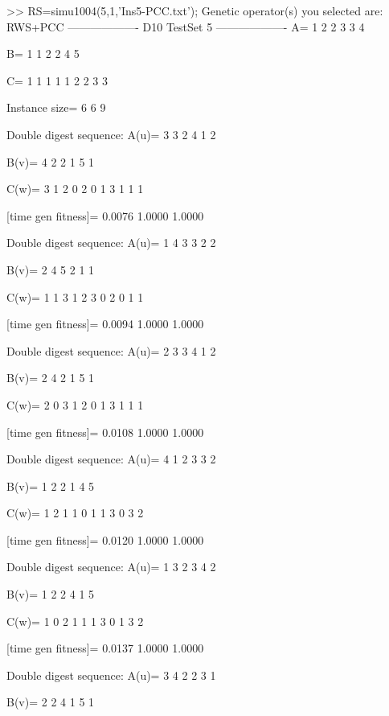 >> RS=simu1004(5,1,'Ins5-PCC.txt');
Genetic operator(s) you selected are:
RWS+PCC
------------------- D10 TestSet 5 -------------------
A=
     1     2     2     3     3     4

B=
     1     1     2     2     4     5

C=
     1     1     1     1     1     2     2     3     3

Instance size=
     6     6     9

Double digest sequence:
A(u)=
     3     3     2     4     1     2

B(v)=
     4     2     2     1     5     1

C(w)=
     3     1     2     0     2     0     1     3     1     1     1

[time gen fitness]=
    0.0076    1.0000    1.0000

Double digest sequence:
A(u)=
     1     4     3     3     2     2

B(v)=
     2     4     5     2     1     1

C(w)=
     1     1     3     1     2     3     0     2     0     1     1

[time gen fitness]=
    0.0094    1.0000    1.0000

Double digest sequence:
A(u)=
     2     3     3     4     1     2

B(v)=
     2     4     2     1     5     1

C(w)=
     2     0     3     1     2     0     1     3     1     1     1

[time gen fitness]=
    0.0108    1.0000    1.0000

Double digest sequence:
A(u)=
     4     1     2     3     3     2

B(v)=
     1     2     2     1     4     5

C(w)=
     1     2     1     1     0     1     1     3     0     3     2

[time gen fitness]=
    0.0120    1.0000    1.0000

Double digest sequence:
A(u)=
     1     3     2     3     4     2

B(v)=
     1     2     2     4     1     5

C(w)=
     1     0     2     1     1     1     3     0     1     3     2

[time gen fitness]=
    0.0137    1.0000    1.0000

Double digest sequence:
A(u)=
     3     4     2     2     3     1

B(v)=
     2     2     4     1     5     1

